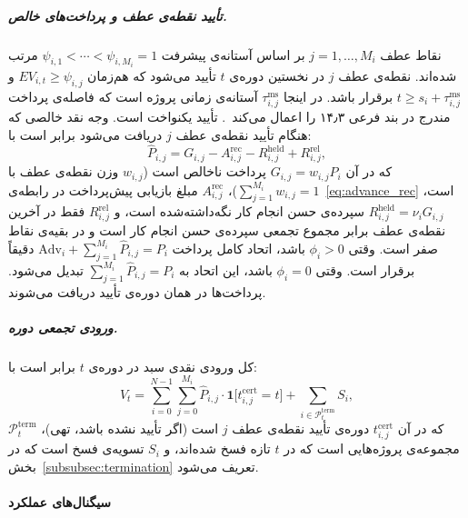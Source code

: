 \subparagraph{تأیید نقطه‌ی عطف و پرداخت‌های خالص.}
نقاط عطف $j = 1, \ldots, M_i$ بر اساس آستانه‌ی پیشرفت
$\psi_{i,1} < \cdots < \psi_{i,M_i} = 1$ مرتب شده‌اند. نقطه‌ی عطف $j$
در نخستین دوره‌ی $t$ تأیید می‌شود که هم‌زمان $EV_{i,t} \geq \psi_{i,j}$
و $t \geq s_i + \tau^{\mathrm{ms}}_{i,j}$ برقرار باشد. در اینجا
$\tau^{\mathrm{ms}}_{i,j}$ آستانه‌ی زمانی پروژه است که فاصله‌ی پرداخت
مندرج در بند فرعی ۱۴٫۳  را اعمال می‌کند~\citep{FIDIC2017}.
تأیید یکنواخت است. وجه نقد خالصی که هنگام تأیید نقطه‌ی عطف $j$ دریافت
می‌شود برابر است با:
\begin{equation}
  \hat{P}_{i,j}
    = G_{i,j}
      - A^{\mathrm{rec}}_{i,j}
      - R^{\mathrm{held}}_{i,j}
      + R^{\mathrm{rel}}_{i,j},
  \label{eq:net_payment}
\end{equation}
که در آن $G_{i,j} = w_{i,j} P_i$ پرداخت ناخالص است ($w_{i,j}$ وزن
نقطه‌ی عطف با $\sum_{j=1}^{M_i} w_{i,j} = 1$)،
$A^{\mathrm{rec}}_{i,j}$ مبلغ بازیابی پیش‌پرداخت
در رابطه‌ی~\eqref{eq:advance_rec} است،
$R^{\mathrm{held}}_{i,j} = \nu_i G_{i,j}$ سپرده‌ی حسن انجام کار
نگه‌داشته‌شده است، و $R^{\mathrm{rel}}_{i,j}$ فقط در آخرین نقطه‌ی عطف
برابر مجموع تجمعی سپرده‌ی حسن انجام کار است و در بقیه‌ی نقاط صفر است.
وقتی $\phi_i > 0$ باشد، اتحاد کامل پرداخت
$\mathrm{Adv}_i + \sum_{j=1}^{M_i} \hat{P}_{i,j} = P_i$ دقیقاً برقرار
است. وقتی $\phi_i = 0$ باشد، این اتحاد به
$\sum_{j=1}^{M_i} \hat{P}_{i,j} = P_i$ تبدیل می‌شود. پرداخت‌ها در همان
دوره‌ی تأیید دریافت می‌شوند.

\subparagraph{ورودی تجمعی دوره.}
کل ورودی نقدی سبد در دوره‌ی $t$ برابر است با:
\begin{equation}
  V_t
    = \sum_{i=0}^{N-1} \sum_{j=0}^{M_i}
        \hat{P}_{i,j} \cdot
        \mathbf{1}\!\bigl[t^{\mathrm{cert}}_{i,j} = t\bigr]
      + \sum_{i \in \mathcal{P}_t^{\mathrm{term}}} S_i,
  \label{eq:Vt}
\end{equation}
که در آن $t^{\mathrm{cert}}_{i,j}$ دوره‌ی تأیید نقطه‌ی عطف $j$ است
(اگر تأیید نشده باشد، تهی)، $\mathcal{P}_t^{\mathrm{term}}$ مجموعه‌ی
پروژه‌هایی است که در $t$ تازه فسخ شده‌اند، و $S_i$ تسویه‌ی فسخ است که
در بخش~\ref{subsubsec:termination} تعریف می‌شود.

\paragraph{سیگنال‌های عملکرد }
\label{subsubsec:evm}

